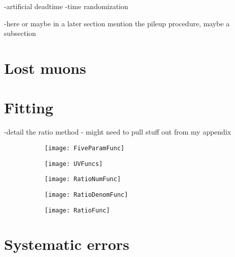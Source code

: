 -artificial deadtime
-time randomization

-here or maybe in a later section mention the pileup procedure, maybe a subsection


\section{Lost muons}
\label{sec:lostmuons}




\section{Fitting}
\label{sec:Fitting}


-detail the ratio method - might need to pull stuff out from my appendix


    \begin{figure}[]
    \centering
        \begin{subfigure}[t]{0.45\textwidth}
            \centering
            \texttt{[image: FiveParamFunc]}
            \caption{}
        \end{subfigure}%

        \vspace{2mm}
        \begin{subfigure}[t]{0.45\textwidth}
            \centering
            \texttt{[image: UVFuncs]}
            \caption{}
        \end{subfigure}
        \begin{subfigure}[t]{0.45\textwidth}
            \centering
            \texttt{[image: RatioNumFunc]}
            \caption{}
        \end{subfigure}%
        \vspace{2mm}
        \begin{subfigure}[t]{0.45\textwidth}
            \centering
            \texttt{[image: RatioDenomFunc]}
            \caption{}
        \end{subfigure}
        \begin{subfigure}[t]{0.45\textwidth}
            \centering
            \texttt{[image: RatioFunc]}
            \caption{}
        \end{subfigure}%
    \caption[]{}
    \label{}
    \end{figure}






\section{Systematic errors}
\label{sec:Systematic Errors}



\cleardoublepage

